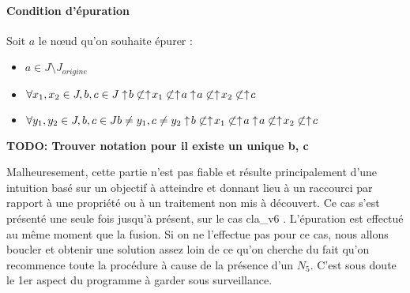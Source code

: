 \paragraph*{Condition d'épuration}
Soit $a$ le n\oe ud qu'on souhaite épurer :
\begin{itemize}
	\item $ a \in J \setminus J_{origine}$
	\item $\forall x_1, x_2 \in J, b, c \in J\\
		\uparrow \! b \not \subset \uparrow \! x_1 \not \subset \uparrow \! a\\
		\uparrow \! a \not \subset \uparrow \! x_2 \not \subset \uparrow \! c$
	\item $\forall y_1, y_2 \in J, b, c \in J\\
		b \neq y_1, c \neq y_2\\
		\uparrow \! b \not \subset \uparrow \! x_1 \not \subset \uparrow \! a\\
		\uparrow \! a \not \subset \uparrow \! x_2 \not \subset \uparrow \! c$
\end{itemize}
{\bf TODO: Trouver notation pour il existe un unique b, c}
\smallbreak

Malheuresement, cette partie n'est pas fiable et résulte principalement d'une intuition basé sur un objectif à atteindre et donnant lieu à un raccourci par rapport à une propriété ou à un traitement non mis à découvert. Ce cas s'est présenté une seule fois jusqu'à présent, sur le cas \guillemotleft{} cla\_v6 \guillemotright{}. L'épuration est effectué au même moment que la fusion. Si on ne l'effectue pas pour ce cas, nous allons boucler et obtenir une solution assez loin de ce qu'on cherche du fait qu'on recommence toute la procédure à cause de la présence d'un $N_5$. C'est sous doute le 1er aspect du programme à garder sous surveillance.

